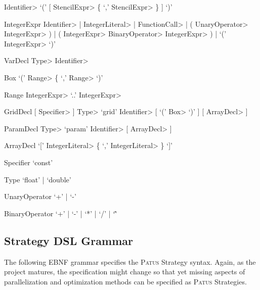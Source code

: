 \begin{EBNF}
		\<Identifier> `(' [ \<StencilExpr> \{ `,' \<StencilExpr> \} ] `)'
	\item[IntegerExpr]
		\<Identifier> | \<IntegerLiteral> | \<FunctionCall> | ( \<UnaryOperator> \<IntegerExpr> ) | ( \<IntegerExpr> \<BinaryOperator> \<IntegerExpr> ) | `(' \<IntegerExpr> `)'
	\item[VarDecl]
		\<Type> \<Identifier>
	\item[Box]
		`(' \<Range> \{ `,' \<Range> `)'
	\item[Range]
		\<IntegerExpr> `..' \<IntegerExpr>
	\item[GridDecl]
		[ \<Specifier> ] \<Type> `grid' \<Identifier> [ `(' \<Box> `)' ] [ \<ArrayDecl> ]
	\item[ParamDecl]
		\<Type> `param' \<Identifier> [ \<ArrayDecl> ]
	\item[ArrayDecl]
		`[' \<IntegerLiteral> \{ `,' \<IntegerLiteral> \} `]'
	\item[Specifier]
		`const'
	\item[Type]
		`float' | `double'
	\item[UnaryOperator]
		`+' | `-'
	\item[BinaryOperator]
		`+' | `-' | `*' | `/' | `\^'
\end{EBNF}



\subsection{Strategy DSL Grammar}

The following EBNF grammar specifies the \textsc{Patus} Strategy syntax.
Again, as the project matures, the specification might change so that yet missing aspects of parallelization and
optimization methods can be specified as \textsc{Patus} Strategies.


